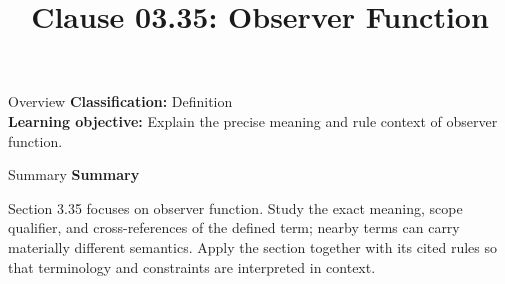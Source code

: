 \documentclass[10pt,letterpaper]{article}
\title{Clause 03.35: Observer Function}
\author{}
\date{}
\begin{document}
\maketitle
\begin{CornellOverviewBox}{Overview}
\textbf{Classification:} Definition\\[2pt]
\textbf{Learning objective:} Explain the precise meaning and rule context of observer function.
\end{CornellOverviewBox}\begin{CornellSummaryBox}{Summary}
{\sffamily\bfseries\color{Accent} Summary}\par\vspace{3pt}Section 3.35 focuses on observer function. Study the exact meaning, scope qualifier, and cross-references of the defined term; nearby terms can carry materially different semantics. Apply the section together with its cited rules so that terminology and constraints are interpreted in context.
\end{CornellSummaryBox}
\end{document}
